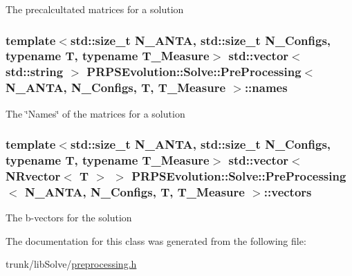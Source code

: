 \-The precalcultated matrices for a solution \hypertarget{class_p_r_p_s_evolution_1_1_solve_1_1_pre_processing_afde3fb319d3c383c4384bfd4ef921bdd}{
\subsubsection[{names}]{\setlength{\rightskip}{0pt plus 5cm}template$<$std\-::size\-\_\-t \-N\-\_\-\-A\-N\-T\-A, std\-::size\-\_\-t \-N\-\_\-\-Configs, typename \-T, typename \-T\-\_\-\-Measure$>$ std\-::vector$<$ std\-::string $>$ {\bf \-P\-R\-P\-S\-Evolution\-::\-Solve\-::\-Pre\-Processing}$<$ \-N\-\_\-\-A\-N\-T\-A, \-N\-\_\-\-Configs, \-T, \-T\-\_\-\-Measure $>$\-::{\bf names}}}\label{class_p_r_p_s_evolution_1_1_solve_1_1_pre_processing_afde3fb319d3c383c4384bfd4ef921bdd}
\-The \char`\"{}\-Names\char`\"{} of the matrices for a solution \hypertarget{class_p_r_p_s_evolution_1_1_solve_1_1_pre_processing_a0bdb461a1530dcba8c79ea249b9ce32a}{
\subsubsection[{vectors}]{\setlength{\rightskip}{0pt plus 5cm}template$<$std\-::size\-\_\-t \-N\-\_\-\-A\-N\-T\-A, std\-::size\-\_\-t \-N\-\_\-\-Configs, typename \-T, typename \-T\-\_\-\-Measure$>$ std\-::vector$<$ \-N\-Rvector$<$ \-T $>$ $>$ {\bf \-P\-R\-P\-S\-Evolution\-::\-Solve\-::\-Pre\-Processing}$<$ \-N\-\_\-\-A\-N\-T\-A, \-N\-\_\-\-Configs, \-T, \-T\-\_\-\-Measure $>$\-::{\bf vectors}}}\label{class_p_r_p_s_evolution_1_1_solve_1_1_pre_processing_a0bdb461a1530dcba8c79ea249b9ce32a}
\-The b-\/vectors for the solution 

\-The documentation for this class was generated from the following file\-:\begin{DoxyCompactItemize}
\item 
trunk/lib\-Solve/\hyperlink{preprocessing_8h}{preprocessing.\-h}\end{DoxyCompactItemize}
